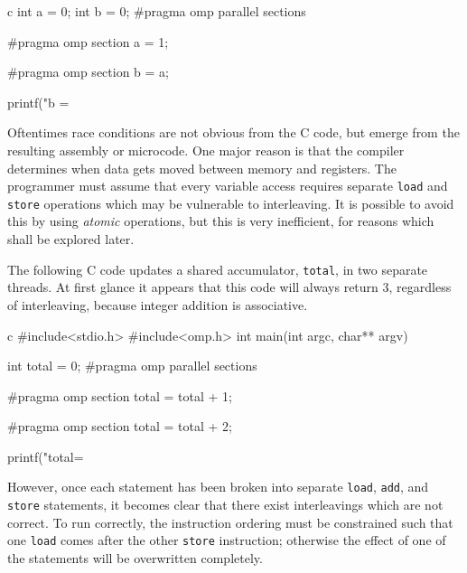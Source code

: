 \documentclass[conference, a4paper]{IEEEtran-modified}
\begin{document}
      \begin{ccode}[]{c}
        int a = 0;
        int b = 0;
        #pragma omp parallel sections
        {
          #pragma omp section
          a = 1;

          #pragma omp section
          b = a;
        }
        printf("b = %


Oftentimes race conditions are not obvious from the C code, but emerge from the resulting assembly or microcode. One major reason is that the compiler determines when data gets moved between memory and registers. The programmer must assume that every variable access requires separate \texttt{load} and \texttt{store} operations which may be vulnerable to interleaving. It is possible to avoid this by using \emph{atomic} operations, but this is very inefficient, for reasons which shall be explored later. 

The following C code updates a shared accumulator, \texttt{total}, in two separate threads. At first glance it appears that this code will always return 3, regardless of interleaving, because integer addition is associative.

        \begin{ccode}[]{c}
        #include<stdio.h>
        #include<omp.h>
        int main(int argc, char** argv) {

          int total = 0;
          #pragma omp parallel sections
          {
            #pragma omp section
            {
              total = total + 1;
            }

            #pragma omp section
            {
              total = total + 2;
            }
          }
          printf("total=%
        }
\end{ccode}



However, once each statement has been broken into separate \texttt{load}, \texttt{add}, and \texttt{store} statements, it becomes clear that there exist interleavings which are not correct. To run correctly, the instruction ordering must be constrained such that one \texttt{load} comes after the other \texttt{store} instruction; otherwise the effect of one of the statements will be overwritten completely.


\begin{multicols}{2}
  

\end{multicols}
\end{ccode}
\end{document}
